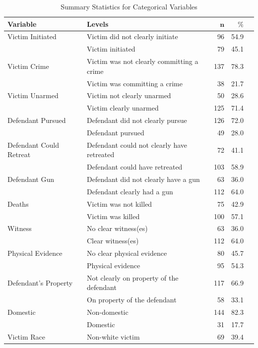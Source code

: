 \documentclass[12pt,article]{article}
\begin{document}
\pagebreak

{\footnotesize
\begin{longtable}{ll|rrr}
\caption{Summary Statistics for Categorical Variables} \\ 
 \textbf{Variable} & \textbf{Levels} & $\mathbf{n}$ & $\mathbf{\%}$ \\ 
  \hline
Victim Initiated & Victim did not clearly initiate & 96 & 54.9 \\ 
   & Victim initiated & 79 & 45.1 \\ 
\hline
Victim Crime & Victim was not clearly committing a crime & 137 & 78.3 \\ 
   & Victim was committing a crime & 38 & 21.7  \\ 
\hline
Victim Unarmed & Victim not clearly unarmed & 50 & 28.6 \\ 
   & Victim clearly unarmed & 125 & 71.4 \\ 
\hline
Defendant Pursued & Defendant did not clearly pursue & 126 & 72.0 \\ 
   & Defendant pursued & 49 & 28.0 \\ 
\hline
Defendant Could Retreat & Defendant could not clearly have retreated & 72 & 41.1 \\ 
   & Defendant could have retreated & 103 & 58.9 \\ 
\hline
Defendant Gun & Defendant did not clearly have a gun & 63 & 36.0 \\ 
   & Defendant clearly had a gun & 112 & 64.0 \\ 
\hline
Deaths & Victim was not killed & 75 & 42.9 \\ 
   & Victim was killed & 100 & 57.1 \\ 
\hline
Witness & No clear witness(es)               & 63 & 36.0 \\ 
   & Clear witness(es) & 112 & 64.0  \\ 
\hline
Physical Evidence & No clear physical evidence & 80 & 45.7 \\ 
   & Physical evidence & 95 & 54.3 \\ 
\hline
Defendant's Property & Not clearly on property of the defendant & 117 & 66.9 \\ 
   & On property of the defendant & 58 & 33.1 \\ 
\hline
Domestic & Non-domestic                             & 144 & 82.3 \\ 
   & Domestic & 31 & 17.7 \\ 
\hline
Victim Race & Non-white victim & 69 & 39.4 \\ 

\end{longtable}}
\end{document}
